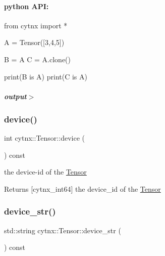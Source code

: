 \begin{DoxyVerbInclude}
\end{DoxyVerbInclude}
 \paragraph*{python A\+PI\+:}


\begin{DoxyCodeInclude}
\textcolor{keyword}{from} cytnx \textcolor{keyword}{import} *

A = Tensor([3,4,5])

B = A
C = A.clone()

print(B \textcolor{keywordflow}{is} A)
print(C \textcolor{keywordflow}{is} A)

\end{DoxyCodeInclude}
 \subparagraph*{output$>$}


\begin{DoxyVerbInclude}
\end{DoxyVerbInclude}
 \mbox{\label{classcytnx_1_1Tensor_ac6d3310eb4defbdacf662dcd81d8fe09}} 
\subsubsection{\texorpdfstring{device()}{device()}}
{\footnotesize\ttfamily int cytnx\+::\+Tensor\+::device (\begin{DoxyParamCaption}{ }\end{DoxyParamCaption}) const\hspace{0.3cm}{\ttfamily [inline]}}



the device-\/id of the \hyperlink{classcytnx_1_1Tensor}{Tensor} 

\begin{DoxyReturn}{Returns}
\mbox{[}cytnx\+\_\+int64\mbox{]} the device\+\_\+id of the \hyperlink{classcytnx_1_1Tensor}{Tensor} 
\end{DoxyReturn}
\mbox{\label{classcytnx_1_1Tensor_a335f7625fa01784f49b2223238d0c14e}} 
\subsubsection{\texorpdfstring{device\+\_\+str()}{device\_str()}}
{\footnotesize\ttfamily std\+::string cytnx\+::\+Tensor\+::device\+\_\+str (\begin{DoxyParamCaption}{ }\end{DoxyParamCaption}) const\hspace{0.3cm}{\ttfamily [inline]}}



